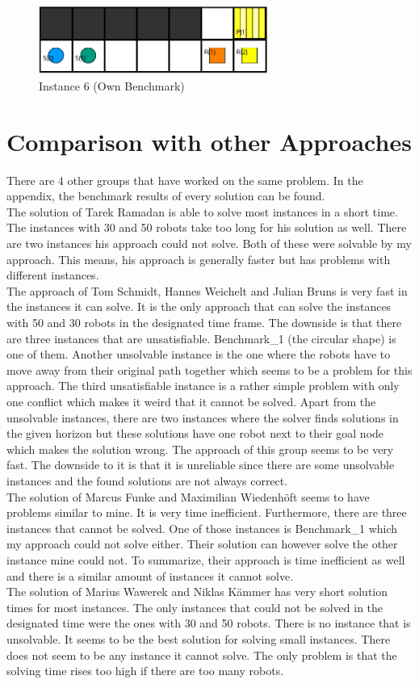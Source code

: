 \documentclass[runningheads]{llncs}
\begin{document}
\begin{figure}[h]
\includegraphics[width=75mm]{Images/Instance 3}
\caption{Instance 6 (Own Benchmark)}
\label{fig:I3}
\end{figure}


\section{Comparison with other Approaches}
There are 4 other groups that have worked on the same problem. In the appendix, the benchmark results of every solution can be found. \\
The solution of Tarek Ramadan \cite{github1} is able to solve most instances in a short time. The instances with 30 and 50 robots take too long for his solution as well. There are two instances his approach could not solve. Both of these were solvable by my approach. This means, his approach is generally faster but has problems with different instances. \\
The approach of Tom Schmidt, Hannes Weichelt and Julian Bruns \cite{github2} is very fast in the instances it can solve. It is the only approach that can solve the instances with 50 and 30 robots in the designated time frame. The downside is that there are three instances that are unsatisfiable. Benchmark\_1 (the circular shape) is one of them. Another unsolvable instance is the one where the robots have to move away from their original path together which seems to be a problem for this approach. The third unsatisfiable instance is a rather simple problem with only one conflict which makes it weird that it cannot be solved. Apart from the unsolvable instances, there are two instances where the solver finds solutions in the given horizon but these solutions have one robot next to their goal node which makes the solution wrong.  The approach of this group seems to be very fast. The downside to it is that it is unreliable since there are some unsolvable instances and the found solutions are not always correct.  \\
The solution of Marcus Funke and Maximilian Wiedenhöft \cite{github3} seems to have problems similar to mine. It is very time inefficient. Furthermore, there are three instances that cannot be solved. One of those instances is Benchmark\_1 which my approach could not solve either. Their solution can however solve the other instance mine could not. To summarize, their approach is time inefficient as well and there is a similar amount of instances it cannot solve. \\
The solution of Marius Wawerek and Niklas Kämmer \cite{github4} has very short solution times for most instances. The only instances that could not be solved in the designated time were the ones with 30 and 50 robots. There is no instance that is unsolvable. It seems to be the best solution for solving small instances. There does not seem to be any instance it cannot solve. The only problem is that the solving time rises too high if there are too many robots.
\end{document}
